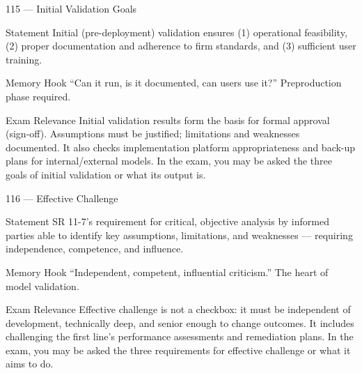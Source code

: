\documentclass[aspectratio=169,8pt]{beamer}
\begin{document}
	\begin{frame}{115 --- Initial Validation Goals}
		\begin{block}{Statement}
			Initial (pre-deployment) validation ensures (1) operational feasibility, (2) proper documentation and adherence to firm standards, and (3) sufficient user training.
		\end{block}
		\begin{block}{Memory Hook}
			``Can it run, is it documented, can users use it?'' Preproduction phase required.
		\end{block}
		\begin{block}{Exam Relevance}
			Initial validation results form the basis for formal approval (sign-off). Assumptions must be justified; limitations and weaknesses documented. It also checks implementation platform appropriateness and back-up plans for internal/external models. In the exam, you may be asked the three goals of initial validation or what its output is.
		\end{block}
	\end{frame}
	
	\begin{frame}{116 --- Effective Challenge}
		\begin{block}{Statement}
			SR 11-7's requirement for critical, objective analysis by informed parties able to identify key assumptions, limitations, and weaknesses --- requiring independence, competence, and influence.
		\end{block}
		\begin{block}{Memory Hook}
			``Independent, competent, influential criticism.'' The heart of model validation.
		\end{block}
		\begin{block}{Exam Relevance}
			Effective challenge is not a checkbox: it must be independent of development, technically deep, and senior enough to change outcomes. It includes challenging the first line's performance assessments and remediation plans. In the exam, you may be asked the three requirements for effective challenge or what it aims to do.
		\end{block}
	\end{frame}
	
\end{document}
